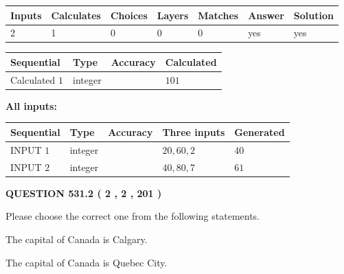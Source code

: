 \documentclass[12pt]{article}
\begin{document}
   
   
   
\noindent\begin{tabular}{|l|l|l|l|l|l|l|}
 \hline
Inputs & Calculates & Choices & Layers & Matches & Answer & Solution \\ \hline
 2  & 
 1  & 
 0
  & 
 0  & 
 0  & 
  yes & 
  yes 
  \\ \hline
 \end{tabular}
   
   
   
   
\noindent{}
   
   
  
  
\noindent\begin{tabular}{|l|l|l|l|}
\hline
 Sequential & Type & Accuracy & Calculated \\ 
\hline
 
 
  Calculated $  1 $ & integer &  & 
  $ 101 $ 
 \\  \hline  
 \end{tabular}
   
   
   
   
\noindent\vspace{0.1in}\hspace{-0.08in} {\textbf{\Large{All inputs: }}}
   
   
  
  
\noindent\begin{tabular}{|l|l|l|l|l|}
\hline
 Sequential & Type & Accuracy & Three inputs & Generated \\ 
\hline
 
 
  INPUT $  1 $ & integer &  & $
 20
 , 
 60
 , 
 2
 $ & $ 40 $ 
 \\  \hline  
 
 
  INPUT $  2 $ & integer &  & $
 40
 , 
 80
 , 
 7
 $ & $ 61 $ 
 \\  \hline  
 \end{tabular}
   
   
  
\vspace{0.2in}
  
{\textbf{\Large{QUESTION
531.2 
 ( 2 , 2 , 201 )
}}}
  
  
Please choose the correct one from the following statements.
 
 
The capital of Canada is Calgary.
 
 
The capital of Canada is Quebec City.
 
\end{document}
